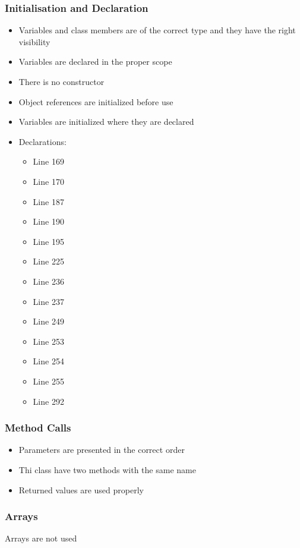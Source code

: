 \subsubsection{Initialisation and Declaration}
\begin{itemize}
\item Variables and class members are of the correct type and they have the right visibility
\item Variables are declared in the proper scope
\item There is no constructor
\item Object references are initialized before use
\item Variables are initialized where they are declared
\item Declarations:
\begin{itemize}
\item Line 169
\item Line 170
\item Line 187
\item Line 190
\item Line 195
\item Line 225
\item Line 236
\item Line 237
\item Line 249
\item Line 253
\item Line 254
\item Line 255
\item Line 292
\end{itemize}
\end{itemize}

\subsubsection{Method Calls}
\begin{itemize}
\item Parameters are presented in the correct order
\item Thi class have two methods with the same name
\item Returned values are used properly
\end{itemize}

\subsubsection{Arrays}
Arrays are not used
